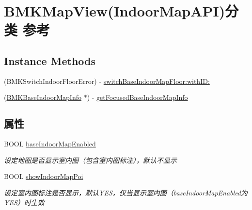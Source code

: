\hypertarget{category_b_m_k_map_view_07_indoor_map_a_p_i_08}{}\section{B\+M\+K\+Map\+View(Indoor\+Map\+A\+P\+I)分类 参考}
\label{category_b_m_k_map_view_07_indoor_map_a_p_i_08}
\subsection*{Instance Methods}
\begin{DoxyCompactItemize}
\item 
(B\+M\+K\+Switch\+Indoor\+Floor\+Error) -\/ \hyperlink{category_b_m_k_map_view_07_indoor_map_a_p_i_08_a4fa740d5b128accf89a08af73885f5fd}{switch\+Base\+Indoor\+Map\+Floor\+:with\+I\+D\+:}
\item 
(\hyperlink{interface_b_m_k_base_indoor_map_info}{B\+M\+K\+Base\+Indoor\+Map\+Info} $\ast$) -\/ \hyperlink{category_b_m_k_map_view_07_indoor_map_a_p_i_08_a0790ec2a447b1525ecb467fc8dce0e26}{get\+Focused\+Base\+Indoor\+Map\+Info}
\end{DoxyCompactItemize}
\subsection*{属性}
\begin{DoxyCompactItemize}
\item 
\hypertarget{category_b_m_k_map_view_07_indoor_map_a_p_i_08_a3113144328807fd2ee01b59a0035196f}{}B\+O\+O\+L \hyperlink{category_b_m_k_map_view_07_indoor_map_a_p_i_08_a3113144328807fd2ee01b59a0035196f}{base\+Indoor\+Map\+Enabled}\label{category_b_m_k_map_view_07_indoor_map_a_p_i_08_a3113144328807fd2ee01b59a0035196f}

\begin{DoxyCompactList}\small\item\em 设定地图是否显示室内图（包含室内图标注），默认不显示 \end{DoxyCompactList}\item 
\hypertarget{category_b_m_k_map_view_07_indoor_map_a_p_i_08_a005cb41e2eba8f1ea0907515b2f0c1b0}{}B\+O\+O\+L \hyperlink{category_b_m_k_map_view_07_indoor_map_a_p_i_08_a005cb41e2eba8f1ea0907515b2f0c1b0}{show\+Indoor\+Map\+Poi}\label{category_b_m_k_map_view_07_indoor_map_a_p_i_08_a005cb41e2eba8f1ea0907515b2f0c1b0}

\begin{DoxyCompactList}\small\item\em 设定室内图标注是否显示，默认\+Y\+E\+S，仅当显示室内图（base\+Indoor\+Map\+Enabled为\+Y\+E\+S）时生效 \end{DoxyCompactList}\end{DoxyCompactItemize}


